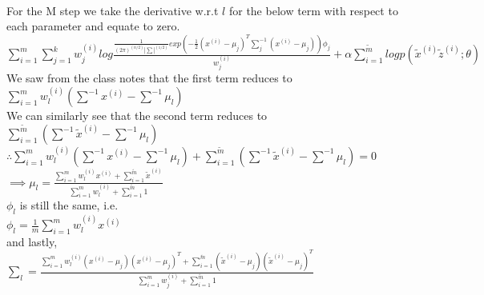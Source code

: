\begin{answer}\\
For the M step we take the derivative w.r.t $l$ for the below term with respect to each parameter and equate to zero.\\
$\sum_{i=1}^{m}\sum_{j=1}^{k} w_j^{(i)} log \frac{\frac{1}{(2 \pi)^(n/2)|\sum|^(1/2)} exp(-\frac{1}{2}(x^{(i)}-\mu_j)^T\sum_j^{-1}(x^{(i)}-\mu_j)) \phi_j}{w_j^{(i)}} +\alpha \sum_{i=1}^{\tilde{m}}log p(\tilde{x}^{(i)}\tilde{z}^{(i)};\theta)$\\
We saw from the class notes that the first term reduces to \\
$\sum_{i=1}^{m}w_l^{(i)}(\sum^{-1}x^{(i)}-\sum^{-1} \mu_l)$\\
We can similarly see that the second term reduces to \\
$\sum_{i=1}^{\tilde{m}}(\sum^{-1}\tilde{x}^{(i)}-\sum^{-1}\mu_l)$\\
$\therefore \sum_{i=1}^{m}w_l^{(i)}(\sum^{-1}x^{(i)}-\sum^{-1} \mu_l)+\sum_{i=1}^{\tilde{m}}(\sum^{-1}\tilde{x}^{(i)}-\sum^{-1}\mu_l)=0$\\
$\implies \mu_l=\frac{\sum_{i=1}^{m}w_l^{(i)}x^{(i)}+\sum_{i=1}^{\tilde{m}}\tilde{x}^{(i)}}{\sum_{i=1}^{m}w_l^{(i)}+\sum_{i=1}^{\tilde{m}}1}$\\
$\phi_l $ is still the same, i.e.\\
$\phi_l=\frac{1}{m} \sum_{i=1}^{m}w_l^{(i)}x^{(i)}$\\
and lastly,\\
$\sum_l=\frac{\sum_{i=1}^{m}w_l^{(i)}(x^{(i)}-\mu_j)(x^{(i)}-\mu_j)^T + \sum_{i=1}^{\tilde{m}}(\tilde{x}^{(i)}-\mu_j)(\tilde{x}^{(i)}-\mu_j)^T}{\sum_{i=1}^{m}w_j^{(i)}+\sum_{i=1}^{\tilde{m}}1}$\\
\end{answer}
